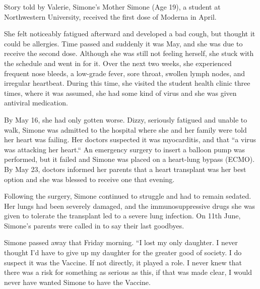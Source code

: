 Story told by Valerie, Simone's Mother Simone (Age 19), a student at
Northwestern University, received the first dose of Moderna in April.

She felt noticeably fatigued afterward and developed a bad cough, but thought it
could be allergies. Time passed and suddenly it was May, and she was due to
receive the second dose. Although she was still not feeling herself, she stuck
with the schedule and went in for it. Over the next two weeks, she experienced
frequent nose bleeds, a low-grade fever, sore throat, swollen lymph nodes, and
irregular heartbeat. During this time, she visited the student health clinic
three times, where it was assumed, she had some kind of virus and she was given
antiviral medication.

By May 16, she had only gotten worse. Dizzy, seriously fatigued and unable to
walk, Simone was admitted to the hospital where she and her family were told her
heart was failing. Her doctors suspected it was myocarditis, and that “a virus
was attacking her heart.“ An emergency surgery to insert a balloon pump was
performed, but it failed and Simone was placed on a heart-lung bypass (ECMO). By
May 23, doctors informed her parents that a heart transplant was her best option
and she was blessed to receive one that evening.

Following the surgery, Simone continued to struggle and had to remain
sedated. Her lungs had been severely damaged, and the immunosuppressive drugs
she was given to tolerate the transplant led to a severe lung infection. On 11th
June, Simone's parents were called in to say their last goodbyes.

Simone passed away that Friday morning. “I lost my only daughter. I never
thought I’d have to give up my daughter for the greater good of society. I do
suspect it was the Vaccine. If not directly, it played a role. I never knew that
there was a risk for something as serious as this, if that was made clear, I
would never have wanted Simone to have the Vaccine.

